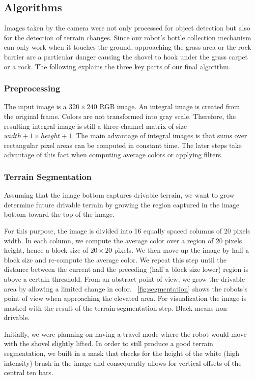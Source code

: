 \subsection{Algorithms}
Images taken by the camera were not only processed for object detection but also for 
the detection of terrain changes. Since our robot's bottle collection mechanism can only
work when it touches the ground, approaching the grass area or the rock barrier are
a particular danger causing the shovel to hook under the grass carpet or a rock.
The following explains the three key parts of our final algorithm.

\subsubsection{Preprocessing}
The input image is a $320 \times 240$ RGB image. 
An integral image is created from the original frame. Colors are not transformed into
gray scale. Therefore, the resulting integral image is still a three-channel matrix
of size $width + 1 \times height + 1$. The main advantage of integral images is 
that sums over rectangular pixel areas can be computed in constant time. The later
steps take advantage of this fact when computing average colors or applying filters.

\subsubsection{Terrain Segmentation}
Assuming that the image bottom captures drivable terrain, we want to grow determine 
future drivable terrain by growing the region captured in the image bottom toward
the top of the image.

For this purpose, the image is divided into 16 equally spaced columns of 20 pixels width.
In each column, we compute the average color over a region of 20 pixels height, hence 
a block size of $20 \times 20$ pixels. We then move up the image by half a block size
and re-compute the average color. We repeat this step until the distance between the
current and the preceding (half a block size lower) region is above a certain 
threshold. From an abstract point of view, we grow the drivable area by allowing a 
limited change in color. \figurename~\ref{fig:segmentation} shows the robots's point
of view when approaching the elevated area. For visualization the image is masked
with the result of the terrain segmentation step. Black means non-drivable.

Initially, we were planning on having a travel mode where the robot would move with the 
shovel slightly lifted. In order to still produce a good terrain segmentation,
we built in a mask that checks for the height of the white (high intensity) brush
in the image and consequently allows for vertical offsets of the central ten bars.

